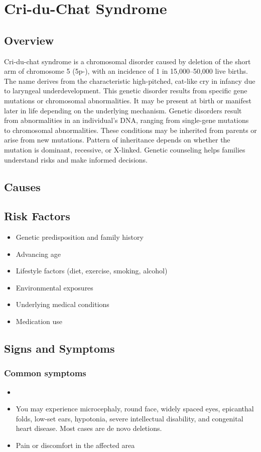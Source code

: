 \chapter{Cri-du-Chat Syndrome}
\label{sec:Cri-du-Chat Syndrome}

\section{Overview}
Cri-du-chat syndrome is a chromosomal disorder caused by deletion of the short arm of chromosome 5 (5p-), with an incidence of 1 in 15,000--50,000 live births. The name derives from the characteristic high-pitched, cat-like cry in infancy due to laryngeal underdevelopment. This genetic disorder results from specific gene mutations or chromosomal abnormalities. It may be present at birth or manifest later in life depending on the underlying mechanism. Genetic disorders result from abnormalities in an individual's DNA, ranging from single-gene mutations to chromosomal abnormalities. These conditions may be inherited from parents or arise from new mutations. Pattern of inheritance depends on whether the mutation is dominant, recessive, or X-linked. Genetic counseling helps families understand risks and make informed decisions.
\section{Causes}
\section{Risk Factors}

\begin{itemize}[noitemsep]
  \item Genetic predisposition and family history
  \item Advancing age
  \item Lifestyle factors (diet, exercise, smoking, alcohol)
  \item Environmental exposures
  \item Underlying medical conditions
  \item Medication use
\end{itemize}
\section{Signs and Symptoms}

\subsection{Common symptoms}
\begin{itemize}[noitemsep]
  \item \item You may experience microcephaly, round face, widely spaced eyes, epicanthal folds, low-set ears, hypotonia, severe intellectual disability, and congenital heart disease. Most cases are de novo deletions.

  \item Pain or discomfort in the affected area
  \end{itemize}

